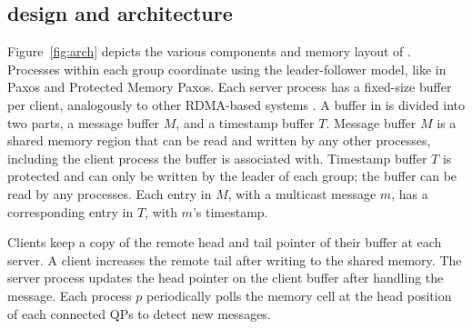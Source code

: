 \subsection{\libname design and architecture}
\label{sec:overview}

Figure~\ref{fig:arch} depicts the various components and memory layout of \libname.
Processes within each group coordinate using the leader-follower model, like in Paxos and Protected Memory Paxos.
Each server process has a fixed-size buffer per client, analogously to other RDMA-based systems \cite{FaRM, Mu, DARE, APUS}.
A buffer in \libname is divided into two parts, a message buffer $M$, and a timestamp buffer $T$.
Message buffer $M$ is a shared memory region that can be read and written by any other processes, including the client process the buffer is associated with.
Timestamp buffer $T$ is protected and can only be written by the leader of each group; the buffer can be read by any processes.
Each entry in $M$, with a multicast message $m$, has a corresponding entry in $T$, with $m$'s timestamp.


Clients keep a copy of the remote head and tail pointer of their buffer at each server. 
A client increases the remote tail after writing to the shared memory. 
The server process updates the head pointer on the client buffer after handling the message.
Each process $p$ periodically polls the memory cell at the head position of each
connected QPs to detect new messages.




